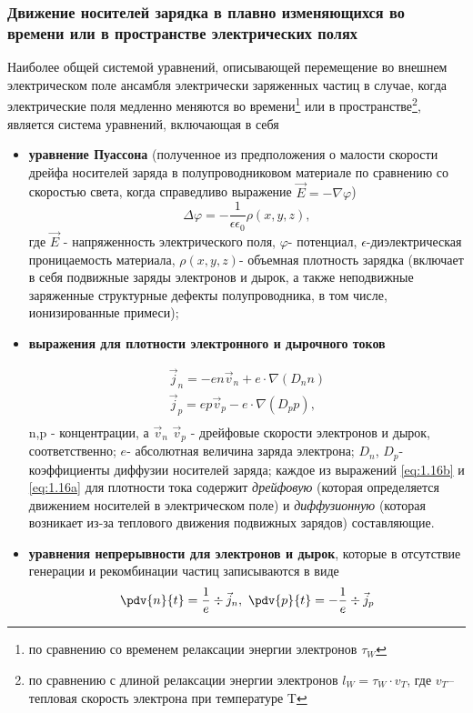 \subsubsection{Движение носителей зарядка в плавно изменяющихся во времени или в пространстве электрических полях}


Наиболее общей системой уравнений, описывающей перемещение во
внешнем электрическом поле ансамбля электрически заряженных частиц в случае, когда электрические поля медленно меняются во времени\footnote{по сравнению со временем релаксации энергии электронов $\tau_W$} или в пространстве\footnote{по сравнению с длиной релаксации энергии электронов $l_W=\tau_W\cdot v_T$, где $v_T$-- тепловая скорость электрона при температуре T}, является система уравнений, включающая в себя

\begin{itemize}
	\item \textbf{уравнение Пуассона} (полученное из предположения о малости скорости дрейфа носителей заряда в полупроводниковом материале по сравнению со скоростью света, когда справедливо выражение $\vec E=-\nabla \varphi $)
\begin{equation}
	\label{eq:1.15}
	\Delta \varphi =- \frac{1}{\epsilon \epsilon_0} \rho(x,y,z),
\end{equation}
 где $\vec E$ - напряженность электрического поля, $\varphi$- потенциал, $\epsilon$-диэлектрическая проницаемость материала, $\rho(x,y,z)$- объемная плотность зарядка (включает в себя подвижные заряды электронов и дырок, а также неподвижные заряженные структурные дефекты полупроводника, в том числе, ионизированные примеси);

 	\item \textbf{выражения для плотности электронного и дырочного токов}

 	\begin{gather}
 		\vec j_n = -en \vec v_n + e\cdot \nabla(D_n n) \\ 
 		\label{eq:1.16a}
 		\vec j_p = ep \vec v_p - e\cdot \nabla(D_p p), \\
 		\label{eq:1.16b}
 	\end{gather}
 	n,p - концентрации, а $\vec v_n$ $\vec v_p$ - дрейфовые скорости электронов и дырок, соответственно; $e$- абсолютная величина заряда электрона; $D_n$, $D_p$- коэффициенты диффузии носителей заряда; каждое из выражений \eqref{eq:1.16b} и \eqref{eq:1.16a} для плотности тока содержит \textit{дрейфовую} (которая определяется движением носителей в электрическом поле) и \textit{диффузионную} (которая возникает из-за теплового движения подвижных зарядов) составляющие.

 	\item \textbf{уравнения непрерывности для электронов и дырок}, которые в отсутствие генерации и рекомбинации частиц записываются в виде
 	\begin{equation}
 		\label{eq:1.17}
 		\pdv{n}{t}=\frac{1}{e}\div{\vec j_n}, ~ \pdv{p}{t}=-\frac{1}{e}\div{\vec j_p}
 	\end{equation}

\end{itemize}
